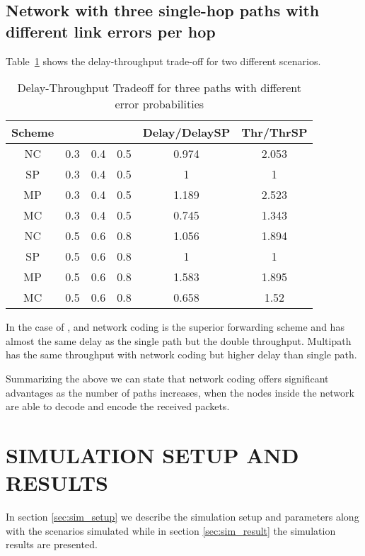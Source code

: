 \documentclass[journal, onecolumn, 12pt]{IEEEtran}
\begin{document}
\subsection{Network with three single-hop paths with different link errors per hop}
\label{sec:numerical_diff_error_per_hop}

Table~\ref{table:trdiff} shows the delay-throughput trade-off for two different scenarios.
\begin{table}[ht]
\centering
\begin{tabular}{c c c c c c}
\hline\hline
Scheme &  &  &  & Delay/DelaySP & Thr/ThrSP\\ [0.5ex]
\hline
NC & 0.3 & 0.4 & 0.5 & 0.974 & 2.053  \\
SP & 0.3 & 0.4 & 0.5 & 1 & 1  \\
MP & 0.3 & 0.4 & 0.5 & 1.189 & 2.523 \\
MC & 0.3 & 0.4 & 0.5 & 0.745 & 1.343 \\ [1ex]


NC & 0.5 & 0.6 & 0.8 & 1.056 & 1.894  \\
SP & 0.5 & 0.6 & 0.8 & 1 & 1  \\
MP & 0.5 & 0.6 & 0.8 & 1.583 & 1.895 \\
MC & 0.5 & 0.6 & 0.8 & 0.658 & 1.52 \\ [1ex]

\hline
\end{tabular}
\caption{Delay-Throughput Tradeoff for three paths with different error probabilities}
\label{table:trdiff}
\end{table}

In the case of ,  and  network coding is the superior forwarding scheme and has almost the same delay as the single path but the double throughput.
Multipath has the same throughput with network coding but  higher delay than single path.

Summarizing the above we can state that network coding offers significant advantages as the number of paths increases, when the nodes inside the network are able to decode and encode the received packets.

\section{\uppercase{Simulation Setup and Results}}
\label{sec:simulation}

In section \ref{sec:sim_setup} we describe the simulation setup and parameters along with the scenarios simulated while in section \ref{sec:sim_result} the simulation results are presented.
\end{document}
